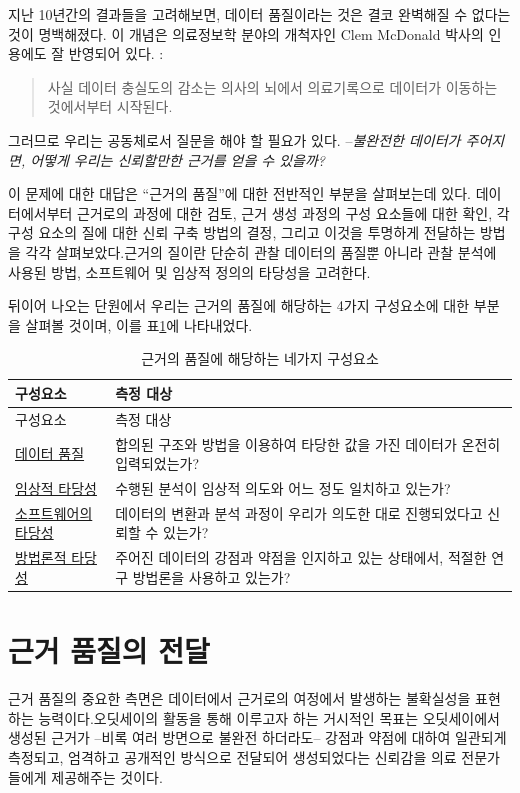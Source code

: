 \documentclass[11pt]{book}
\theoremstyle{definition}
\theoremstyle{definition}
\theoremstyle{definition}
\theoremstyle{remark}
\begin{document}
지난 10년간의 결과들을 고려해보면, 데이터 품질이라는 것은 결코 완벽해질
수 없다는 것이 명백해졌다. 이 개념은 의료정보학 분야의 개척자인 Clem
McDonald 박사의 인용에도 잘 반영되어 있다. :

\begin{quote}
사실 데이터 충실도의 감소는 의사의 뇌에서 의료기록으로 데이터가 이동하는
것에서부터 시작된다. 
\end{quote}

그러므로 우리는 공동체로서 질문을 해야 할 필요가 있다. --\emph{불완전한
데이터가 주어지면, 어떻게 우리는 신뢰할만한 근거를 얻을 수 있을까?}

이 문제에 대한 대답은 ``근거의 품질''에 대한 전반적인 부분을 살펴보는데
있다. 데이터에서부터 근거로의 과정에 대한 검토, 근거 생성 과정의 구성
요소들에 대한 확인, 각 구성 요소의 질에 대한 신뢰 구축 방법의 결정,
그리고 이것을 투명하게 전달하는 방법을 각각 살펴보았다.근거의 질이란
단순히 관찰 데이터의 품질뿐 아니라 관찰 분석에 사용된 방법, 소프트웨어
및 임상적 정의의 타당성을 고려한다. 

뒤이어 나오는 단원에서 우리는 근거의 품질에 해당하는 4가지 구성요소에
대한 부분을 살펴볼 것이며, 이를 표\ref{tab:evidenceQuality}에
나타내었다.

\begin{longtable}[]{@{}ll@{}}
\caption{\label{tab:evidenceQuality} 근거의 품질에 해당하는 네가지
구성요소}\tabularnewline
\toprule
구성요소 & 측정 대상\tabularnewline
\midrule
\endfirsthead
\toprule
구성요소 & 측정 대상\tabularnewline
\midrule
\endhead
\href{DataQuality.html}{데이터 품질} & 합의된 구조와 방법을 이용하여
타당한 값을 가진 데이터가 온전히 입력되었는가?\tabularnewline
\href{ClinicalValidity.html}{임상적 타당성} & 수행된 분석이 임상적
의도와 어느 정도 일치하고 있는가?\tabularnewline
\href{SoftwareValidity.html}{소프트웨어의 타당성} & 데이터의 변환과 분석
과정이 우리가 의도한 대로 진행되었다고 신뢰할 수 있는가?\tabularnewline
\href{MethodValidity.html}{방법론적 타당성} & 주어진 데이터의 강점과
약점을 인지하고 있는 상태에서, 적절한 연구 방법론을 사용하고
있는가?\tabularnewline
\bottomrule
\end{longtable}

\section{근거 품질의 전달}\label{--}

근거 품질의 중요한 측면은 데이터에서 근거로의 여정에서 발생하는
불확실성을 표현하는 능력이다.오딧세이의 활동을 통해 이루고자 하는
거시적인 목표는 오딧세이에서 생성된 근거가 --비록 여러 방면으로 불완전
하더라도-- 강점과 약점에 대하여 일관되게 측정되고, 엄격하고 공개적인
방식으로 전달되어 생성되었다는 신뢰감을 의료 전문가들에게 제공해주는
것이다.
\end{document}
